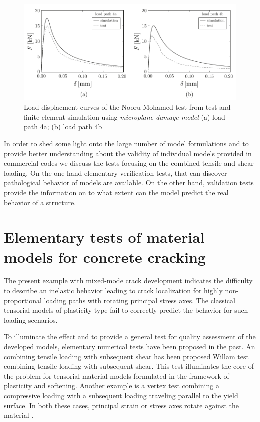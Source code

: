 \documentclass[main.tex]{subfiles}
\begin{document}
\begin{figure}
\centering
\includegraphics[scale=0.9]{fig/nooru-mohamed-f-delta-mdm.pdf}
\caption{Load-displacment curves of the Nooru-Mohamed test from test and finite element simulation using \textit{microplane damage model} (a) load path 4a; (b) load path 4b}
\label{FIGnoorumodamedfdeltamdm}
\end{figure}

In order to shed some light onto the large number of model formulations
and to provide better understanding about the validity of individual models
provided in commercial codes we discuss the tests focusing on the combined
tensile and shear loading. 
On the one hand elementary verification tests, that can discover pathological behavior of models are available. 
On the other hand, validation tests provide the information on to what extent can the model predict the real behavior of a structure. 
 
\section{Elementary tests of material models for concrete cracking}

The present example with mixed-mode crack development indicates the difficulty 
to describe an inelastic behavior leading to crack localization for highly non-proportional loading paths with rotating principal stress axes. 
The  classical  tensorial  models  of  plasticity  type fail to correctly predict  the behavior for such  loading scenarios.

To illuminate the effect and to provide a general test for quality assessment of the developed models, elementary numerical tests have been proposed in the past. An combining tensile loading with subsequent shear has been proposed Willam test \cite{willam1989fundamental} combining tensile loading with subsequent shear. This test illuminates the core of the problem for tensorial material models formulated in the framework of plasticity and softening. Another example is a vertex test combining a compressive loading with a subsequent loading traveling parallel to the yield surface. In both these cases,   principal strain  or  stress  axes  rotate  against  the  material \cite{caner2002vertex}.
\end{document}

